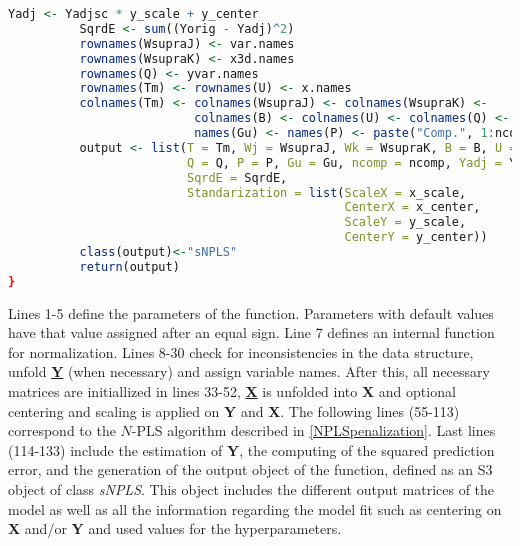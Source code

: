 \begin{scriptsize}
\begin{lstlisting}[language=R, deletekeywords={scale, !=, <-, !, Q, qf, names, max, var}, otherkeywords={}, morekeywords={unfold3w}, caption=sNPLS main function]
          Yadj <- Yadjsc * y_scale + y_center
          SqrdE <- sum((Yorig - Yadj)^2)
          rownames(WsupraJ) <- var.names
          rownames(WsupraK) <- x3d.names
          rownames(Q) <- yvar.names
          rownames(Tm) <- rownames(U) <- x.names
          colnames(Tm) <- colnames(WsupraJ) <- colnames(WsupraK) <- 
                          colnames(B) <- colnames(U) <- colnames(Q) <- 
                          names(Gu) <- names(P) <- paste("Comp.", 1:ncomp)
          output <- list(T = Tm, Wj = WsupraJ, Wk = WsupraK, B = B, U = U, 
                         Q = Q, P = P, Gu = Gu, ncomp = ncomp, Yadj = Yadj, 
                         SqrdE = SqrdE, 
                         Standarization = list(ScaleX = x_scale, 
                                               CenterX = x_center,
                                               ScaleY = y_scale, 
                                               CenterY = y_center))
          class(output)<-"sNPLS"
          return(output)
}
\end{lstlisting}
\end{scriptsize}

Lines 1-5 define the parameters of the function. Parameters with default values have that value assigned after an equal sign. Line 7 defines an internal function for normalization. Lines 8-30 check for inconsistencies in the data structure, unfold \textbf{\underline{Y}} (when necessary) and assign variable names. After this, all necessary matrices are initiallized in lines 33-52, \textbf{\underline{X}} is unfolded into \textbf{X} and optional centering and scaling is applied on \textbf{Y} and \textbf{X}. The following lines (55-113) correspond to the $N$-PLS algorithm described in \autoref{NPLSpenalization}. Last lines (114-133) include the estimation of \textbf{Y}, the computing of the squared prediction error, and the generation of the output object of the function, defined as an S3 object of class \textit{sNPLS}. This object includes the different output matrices of the model as well as all the information regarding the model fit such as centering on \textbf{X} and/or \textbf{Y} and used values for the hyperparameters. 



